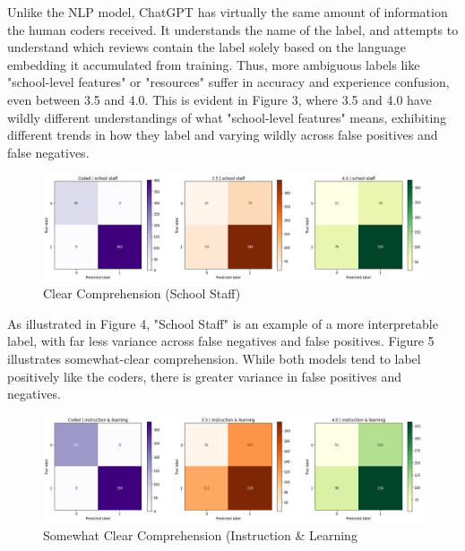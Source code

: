 \documentclass[12pt,a4paper]{article}
\begin{document}
\noindent Unlike the NLP model, ChatGPT has virtually the same amount of information the human coders received. It understands the name of the label, and attempts to understand which reviews contain the label solely based on the language embedding it accumulated from training. Thus, more ambiguous labels like "school-level features" or "resources" suffer in accuracy and experience confusion, even between 3.5 and 4.0. This is evident in Figure 3, where 3.5 and 4.0 have wildly different understandings of what "school-level features" means, exhibiting different trends in how they label and varying wildly across false positives and false negatives.\\

\begin{figure}[H]
    \centering
    \includegraphics[width=1\linewidth]{school_staff_confusion_full.png}
    \caption{Clear Comprehension (School Staff)}
    \label{fig:enter-label}
\end{figure}

\noindent As illustrated in Figure 4, "School Staff" is an example of a more interpretable label, with far less variance across false negatives and false positives. Figure 5 illustrates somewhat-clear comprehension. While both models tend to label positively like the coders, there is greater variance in false positives and negatives.\\

\begin{figure}[H]
    \centering
    \includegraphics[width=1\linewidth]{instruction_and_learning_confusion_full.png}
    \caption{Somewhat Clear Comprehension (Instruction \& Learning}
    \label{fig:enter-label}
\end{figure}
\end{document}
